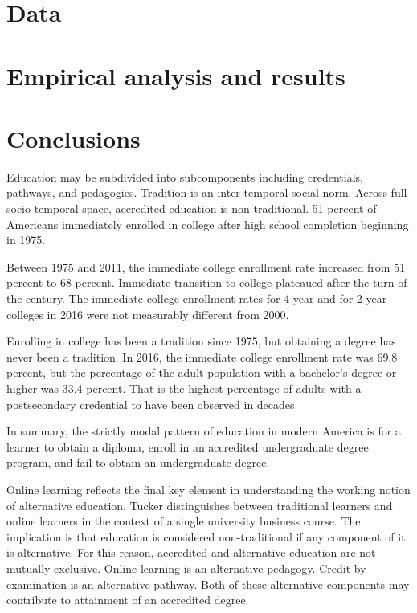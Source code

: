 \documentclass[AER]{./aea-latex-templates/AEA}
\begin{document}
        \section{Data}

        \section{Empirical analysis and results}

        \section{Conclusions}
        
        Education may be subdivided into subcomponents including credentials, pathways,
        and pedagogies. Tradition is an inter-temporal social norm. Across
        full socio-temporal space, accredited education is non-traditional. 51
        percent of Americans immediately enrolled in college after high school completion
        beginning in 1975\cite{aud2013condition}.
        
        Between 1975 and 2011, the immediate college enrollment
        rate increased from 51 percent to 68 percent. Immediate transition to
        college plateaued after the turn of the century. The immediate college
        enrollment rates for 4-year and for 2-year colleges in 2016 were not
        measurably different from 2000\cite{nces2019condition}.
        
        Enrolling in college has been a tradition since 1975, but obtaining a
        degree has never been a tradition. In 2016, the immediate college
        enrollment rate was 69.8 percent\cite{nces_2019}, but the
        percentage of the adult population with a bachelor’s degree or higher was
        33.4 percent\cite{censusbureau_2017}. That is the highest percentage of
        adults with a postsecondary credential to have been observed in decades.
        
        In summary, the strictly modal pattern of education in modern America
        is for a learner to obtain a diploma, enroll in an accredited undergraduate degree
        program, and fail to obtain an undergraduate degree.
        
        Online learning reflects the final key element in understanding the working notion of
        alternative education. Tucker\cite{tucker2001distance} distinguishes between traditional
        learners and online learners in the context of a single university business course.
        The implication is that education is considered non-traditional if any component of it
        is alternative. For this reason, accredited and alternative education are not mutually exclusive.
        Online learning is an alternative pedagogy. Credit by examination is an alternative
        pathway. Both of these alternative components may contribute to attainment of an accredited degree.
        
\end{document}
